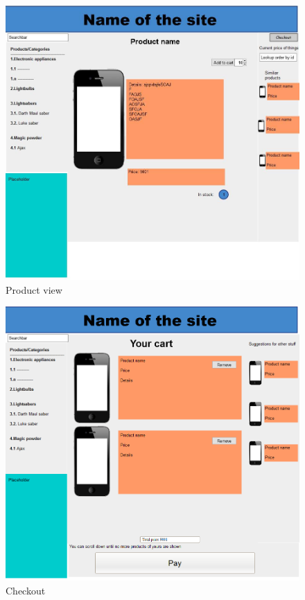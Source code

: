 \documentclass[a4paper,12pt]{article}
\begin{document}
\begin{figure}[htbp]
	\caption{Product view}
	\includegraphics[width=\textwidth,height=\textheight,keepaspectratio]{img/Product_view.png}
\end{figure}

\begin{figure}[htbp]
	\caption{Checkout}
	\includegraphics[width=\textwidth,height=\textheight,keepaspectratio]{img/Checkout.png}
\end{figure}
\end{document}
